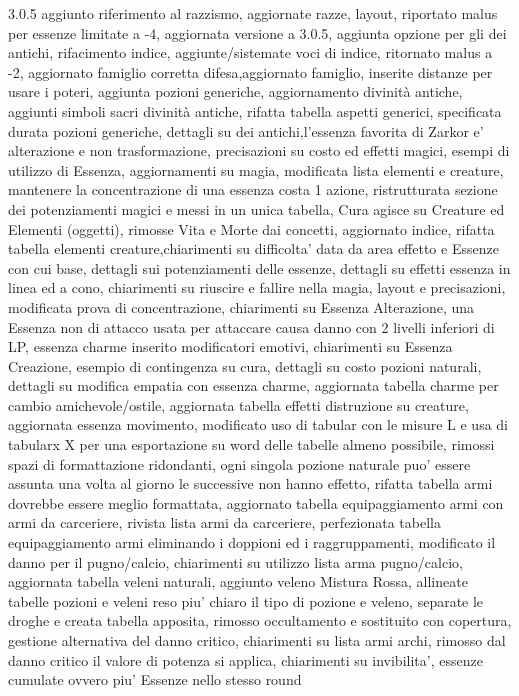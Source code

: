 \documentclass[a4paper,11pt,twoside,openany]{book}
\begin{document}
{    3.0.5 aggiunto riferimento al razzismo, aggiornate razze, layout, riportato malus per essenze limitate a -4, aggiornata versione a 3.0.5, aggiunta opzione per gli dei antichi,  rifacimento indice, aggiunte/sistemate voci di indice, ritornato malus a -2, aggiornato famiglio corretta difesa,aggiornato famiglio, inserite distanze per usare i poteri, aggiunta pozioni generiche, aggiornamento divinità antiche, aggiunti simboli sacri divinità antiche, rifatta tabella aspetti generici, specificata durata pozioni generiche, dettagli su dei antichi,l'essenza favorita di Zarkor e' alterazione e non trasformazione, precisazioni su costo ed effetti magici, esempi di utilizzo di Essenza, aggiornamenti su magia, modificata lista elementi e creature, mantenere la concentrazione di una essenza costa 1 azione, ristrutturata sezione dei potenziamenti magici e messi in un unica tabella, Cura agisce su Creature ed Elementi (oggetti), rimosse Vita e Morte dai concetti, aggiornato indice, rifatta tabella elementi creature,chiarimenti su difficolta' data da area effetto e Essenze con cui base, dettagli sui potenziamenti delle essenze, dettagli su effetti essenza in linea  ed a cono, chiarimenti su riuscire e fallire nella magia, layout e precisazioni, modificata prova di concentrazione, chiarimenti su Essenza Alterazione, una Essenza non di attacco usata per attaccare causa danno con 2 livelli inferiori di LP, essenza charme inserito modificatori emotivi, chiarimenti su Essenza Creazione, esempio di contingenza su cura, dettagli su costo pozioni naturali, dettagli su modifica empatia con essenza charme, aggiornata tabella charme per cambio amichevole/ostile, aggiornata tabella effetti distruzione su creature, aggiornata essenza movimento, modificato uso di tabular con le misure L e usa di tabularx X per una esportazione su word delle tabelle almeno possibile, rimossi spazi di formattazione ridondanti, ogni singola pozione naturale puo' essere assunta una volta al giorno le successive non hanno effetto, rifatta tabella armi dovrebbe essere meglio formattata, aggiornato tabella equipaggiamento armi con armi da carceriere, rivista lista armi da carceriere, perfezionata tabella equipaggiamento armi eliminando i doppioni ed i raggruppamenti, modificato il danno per il pugno/calcio, chiarimenti su utilizzo lista arma pugno/calcio, aggiornata tabella veleni naturali, aggiunto veleno Mistura Rossa, allineate tabelle pozioni e veleni reso piu' chiaro il tipo di pozione e veleno, separate le droghe e creata tabella apposita, rimosso occultamento e sostituito con copertura, gestione alternativa del danno critico, chiarimenti su lista armi archi, rimosso dal danno critico il valore di potenza si applica, chiarimenti su invibilita', essenze cumulate ovvero piu' Essenze nello stesso round
}

\pagebreak

\printindex
\end{document}
